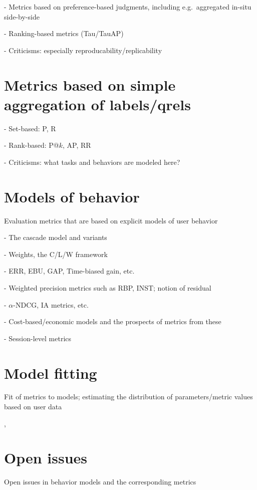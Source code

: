 \documentclass[openany]{now} %
\begin{document}
- Metrics based on preference-based judgments, including e.g.\ aggregated in-situ side-by-side \cite{Thomas2006}

- Ranking-based metrics (Tau/TauAP)

- Criticisms: especially reproducability/replicability

\section{Metrics based on simple aggregation of labels/qrels}

- Set-based: P, R

- Rank-based: P@$k$, AP, RR

- Criticisms: what tasks and behaviors are modeled here?

\section{Models of behavior}

Evaluation metrics that are based on explicit models of user behavior

- The cascade model and variants

- Weights, the C/L/W framework \citep{Moffat2013}

- ERR, EBU, GAP, Time-biased gain, etc.

- Weighted precision metrics such as RBP, INST; notion of residual \citep{Moffat08,Moffat15}

- $\alpha$-NDCG, IA metrics, etc.

- Cost-based/economic models and the prospects of metrics from these

- Session-level metrics \cite{kanoulas2011evaluating} \cite{Järvelin2008}

\section{Model fitting}

Fit of metrics to models; estimating the distribution of parameters/metric values based on user data

\cite{CarteretteKY11}, \cite{Moffat2013}

\section{Open issues}

Open issues in behavior models and the corresponding metrics
\end{document}
